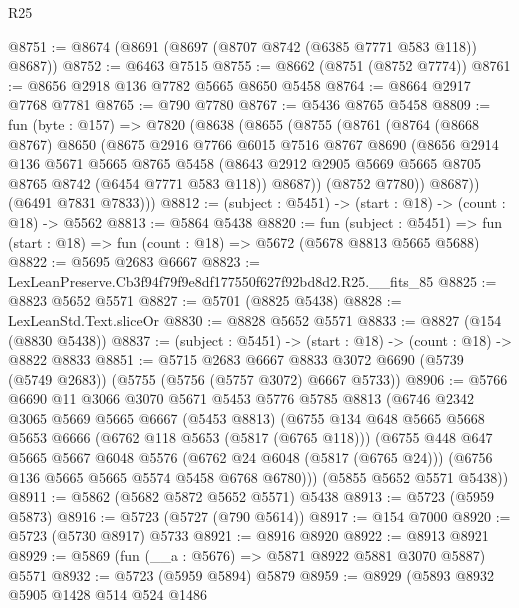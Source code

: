 \begin{lexlean}{R25}
\begin{coremodule}
@8751 := @8674 (@8691 (@8697 (@8707 @8742 (@6385 @7771 @583 @118)) @8687))
@8752 := @6463 @7515
@8755 := @8662 (@8751 (@8752 @7774))
@8761 := @8656 @2918 @136 @7782 @5665 @8650 @5458
@8764 := @8664 @2917 @7768 @7781
@8765 := @790 @7780
@8767 := @5436 @8765 @5458
@8809 := fun (byte : @157) =>
  @7820
    (@8638
      (@8655
        (@8755
          (@8761
            (@8764
              (@8668 @8767)
              @8650
              (@8675
                @2916
                @7766
                @6015
                @7516
                @8767
                @8690
                (@8656
                  @2914
                  @136
                  @5671
                  @5665
                  @8765
                  @5458
                  (@8643 @2912 @2905 @5669 @5665 @8705 @8765 @8742 (@6454 @7771 @583 @118))
                  @8687))
              (@8752 @7780))
            @8687))
        (@6491 @7831 @7833)))
@8812 := (subject : @5451) -> (start : @18) -> (count : @18) -> @5562
@8813 := @5864 @5438
@8820 := fun (subject : @5451) =>
  fun (start : @18) => fun (count : @18) => @5672 (@5678 @8813 @5665 @5688)
@8822 := @5695 @2683 @6667
@8823 := LexLeanPreserve.Cb3f94f79f9e8df177550f627f92bd8d2.R25.__fits_85
@8825 := @8823 @5652 @5571
@8827 := @5701 (@8825 @5438)
@8828 := LexLeanStd.Text.sliceOr
@8830 := @8828 @5652 @5571
@8833 := @8827 (@154 (@8830 @5438))
@8837 := (subject : @5451) -> (start : @18) -> (count : @18) -> @8822 @8833
@8851 := @5715
    @2683
    @6667
    @8833
    @3072
    @6690
    (@5739 (@5749 @2683))
    (@5755 (@5756 (@5757 @3072) @6667 @5733))
@8906 := @5766
    @6690
    @11
    @3066
    @3070
    @5671
    @5453
    @5776
    @5785
    @8813
    (@6746
      @2342
      @3065
      @5669
      @5665
      @6667
      (@5453 @8813)
      (@6755
        @134
        @648
        @5665
        @5668
        @5653
        @6666
        (@6762 @118 @5653 (@5817 (@6765 @118)))
        (@6755
          @448
          @647
          @5665
          @5667
          @6048
          @5576
          (@6762 @24 @6048 (@5817 (@6765 @24)))
          (@6756 @136 @5665 @5665 @5574 @5458 @6768 @6780)))
      (@5855 @5652 @5571 @5438))
@8911 := @5862 (@5682 @5872 @5652 @5571) @5438
@8913 := @5723 (@5959 @5873)
@8916 := @5723 (@5727 (@790 @5614))
@8917 := @154 @7000
@8920 := @5723 (@5730 @8917) @5733
@8921 := @8916 @8920
@8922 := @8913 @8921
@8929 := @5869 (fun (__a : @5676) => @5871 @8922 @5881 @3070 @5887) @5571
@8932 := @5723 (@5959 @5894) @5879
@8959 := @8929
    (@5893
      @8932
      @5905
      @1428
      @514
      @524
      @1486

\end{coremodule}
\end{lexlean}
